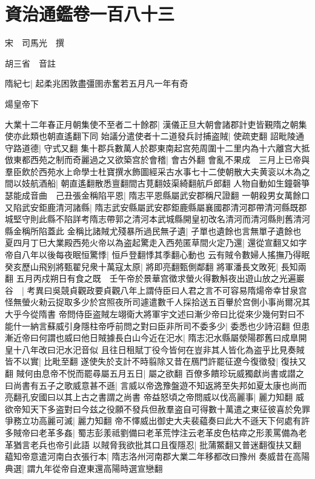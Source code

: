\chapter{資治通鑑卷一百八十三}
宋　司馬光　撰

胡三省　音註

隋紀七|{
	起柔兆困敦盡彊圉赤奮若五月凡一年有奇}


煬皇帝下

大業十二年春正月朝集使不至者二十餘郡|{
	漢儀正旦大朝會諸郡計吏皆覲隋之朝集使亦此類也朝直遙翻下同}
始議分遣使者十二道發兵討捕盗賊|{
	使疏吏翻}
詔毗陵通守路道德|{
	守式又翻}
集十郡兵數萬人於郡東南起宫苑周圍十二里内為十六離宫大抵倣東都西苑之制而奇麗過之又欲築宫於會稽|{
	會古外翻}
會亂不果成　三月上已帝與羣臣飲於西苑水上命學士杜寶撰水飾圖經采古水事七十二使朝散大夫黄衮以木為之間以妓航酒船|{
	朝直遙翻散悉亶翻間古莧翻妓渠綺翻航戶郎翻}
人物自動如生鐘磬箏瑟能成音曲　己丑張金稱陷平恩|{
	隋志平恩縣屬武安郡稱尺證翻}
一朝殺男女萬餘口又陷武安鉅鹿清河諸縣|{
	隋志武安縣屬武安郡鉅鹿縣屬襄國郡清河郡帶清河縣既郡城堅守則此縣不陷詳考隋志帶郭之清河本武城縣開皇初改名清河而清河縣則舊清河縣金稱所陷蓋此}
金稱比諸賊尤殘暴所過民無孑遺|{
	孑單也遺餘也言無單孑遺餘也}
夏四月丁巳大業殿西苑火帝以為盗起驚走入西苑匿草間火定乃還|{
	還從宣翻又如字}
帝自八年以後每夜眠恒驚悸|{
	恒戶登翻悸其季翻心動也}
云有賊令數婦人搖撫乃得眠　癸亥歷山飛别將甄翟兒衆十萬寇太原|{
	將即亮翻甄側鄰翻}
將軍潘長文敗死|{
	長知兩翻}
五月丙戍朔日有食之既　壬午帝於景華宫徵求螢火得數斛夜出遊山放之光遍巖谷　|{
	考異曰吳競貞觀政要貞觀八年上謂侍臣曰人君之言不可容易隋煬帝幸甘泉宫怪無螢火勑云捉取多少於宫照夜所司遽遣數千人採拾送五百轝於宫側小事尚爾况其大乎今從隋書}
帝問侍臣盗賊左翊衛大將軍宇文述曰漸少帝曰比從來少幾何對曰不能什一納言蘇威引身隱柱帝呼前問之對曰臣非所司不委多少|{
	委悉也少詩沼翻}
但患漸近帝曰何謂也威曰他日賊據長白山今近在汜水|{
	隋志汜水縣屬滎陽郡舊曰成臯開皇十八年改曰汜水汜音似}
且往日租賦丁役今皆何在豈非其人皆化為盗乎比見奏賊皆不以實|{
	比毗至翻}
遂使失於支計不時翦除又昔在鴈門許罷征遼今復徵發|{
	復扶又翻}
賊何由息帝不悦而罷尋屬五月五日|{
	屬之欲翻}
百僚多饋珍玩威獨獻尚書或譛之曰尚書有五子之歌威意甚不遜|{
	言威以帝逸豫盤遊不知返將至失邦如夏太康也尚而亮翻孔安國曰以其上古之書謂之尚書}
帝益怒頃之帝問威以伐高麗事|{
	麗力知翻}
威欲帝知天下多盗對曰今兹之役願不發兵但赦羣盗自可得數十萬遣之東征彼喜於免罪爭務立功高麗可滅|{
	麗力知翻}
帝不懌威出御史大夫裴藴奏曰此大不遜天下何處有許多賊帝曰老革多姦|{
	蜀志彭羕祗劉備曰老革荒悖注云老革皮色枯瘁之形羕罵備為老革猶言老兵也帝引此語}
以賊脅我欲批其口且復隱忍|{
	批蒲鱉翻又普迷翻復扶又翻}
藴知帝意遣河南白衣張行本|{
	隋志洛州河南郡大業二年移都改曰豫州}
奏威昔在高陽典選|{
	謂九年從帝自遼東還高陽時選宣戀翻}
